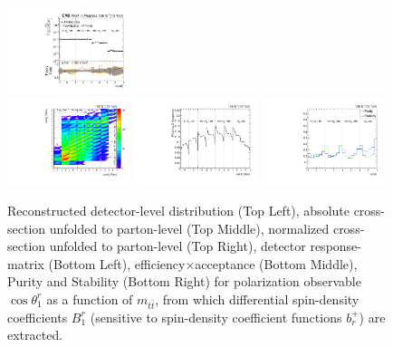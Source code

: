 \begin{refsection}
\begin{figure}[htb]
\begin{center}
 \includegraphics[width=0.32\textwidth]{fig_fullRun2UL/unfolding/combined/UnfoldedResultsNorm_b1r_mttbar.pdf} \\
 \includegraphics[width=0.32\textwidth]{fig_fullRun2UL/unfolding/combined/ResponseMatrix_b1r_mttbar.pdf}
 \includegraphics[width=0.32\textwidth]{fig_fullRun2UL/unfolding/combined/TotEff_b1r_mttbar.pdf}
 \includegraphics[width=0.32\textwidth]{fig_fullRun2UL/unfolding/combined/PurStab_b1r_mttbar.pdf} \\
\caption{Reconstructed detector-level distribution (Top Left), absolute cross-section unfolded to parton-level (Top Middle), normalized cross-section unfolded to parton-level (Top Right), detector response-matrix (Bottom Left), efficiency$\times$acceptance (Bottom Middle), Purity and Stability (Bottom Right) for polarization observable $\cos\theta_{1}^{r}$ as a function of $m_{t\bar{t}}$, from which differential spin-density coefficients $B_{1}^{r}$ (sensitive to spin-density coefficient functions $b_r^{+}$) are extracted.}
\label{fig:b1r_mttbar}
\end{center}
\end{figure}
\clearpage
\begin{figure}[htb]
\begin{center}

\end{center}
\end{figure}
\end{refsection}
